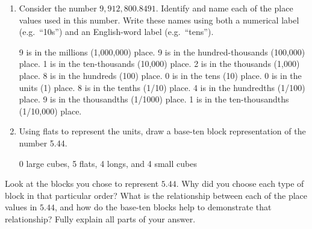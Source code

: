 
\begin{enumerate}
    \item Consider the number $9,912,800.8491$. Identify and name each of the place values used in this number. Write these names using both a numerical label (e.g.\ ``10s'') and an English-word label (e.g.\ ``tens'').

    \vfill
    \begin{ansenv}
        9 is in the millions (1,000,000) place.
9 is in the hundred-thousands (100,000) place.
1 is in the ten-thousands (10,000) place.
2 is in the thousands (1,000) place.
8 is in the hundreds (100) place.
0 is in the tens (10) place.
0 is in the units (1) place.
8 is in the tenths (1/10) place.
4 is in the hundredths (1/100) place.
9 is in the thousandths (1/1000) place.
1 is in the ten-thousandths (1/10,000) place.

    \end{ansenv}
    \vfill

    \item Using flats to represent the units, draw a base-ten block representation of the number 5.44.

    \vfill
    \begin{ansenv}
        0 large cubes, 5 flats, 4 longs, and 4 small cubes
    \end{ansenv}
    \vfill
\end{enumerate}

\newpage


Look at the blocks you chose to represent $5.44$. Why did you choose each type of block in that particular order? What is the relationship between each of the place values in $5.44$, and how do the base-ten blocks help to demonstrate that relationship? Fully explain all parts of your answer.